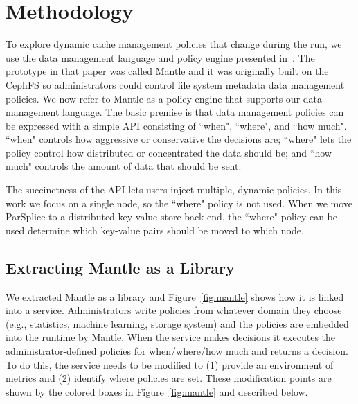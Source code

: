 \section{Methodology}

To explore dynamic cache management policies that change during the run, we use
the data management language and policy engine presented
in~\cite{sevilla:sc15-mantle}. The prototype in that paper was called Mantle
and it was originally built on the CephFS so administrators could control file
system metadata data management policies. We now refer to Mantle as a policy
engine that supports our data management language.  The basic premise is that
data management policies can be expressed with a simple API consisting of
``when", ``where", and ``how much". ``when" controls how aggressive or
conservative the decisions are; ``where" lets the policy control how
distributed or concentrated the data should be; and ``how much" controls the
amount of data that should be sent.

The succinctness of the API lets users inject multiple, dynamic policies. In
this work we focus on a single node, so the ``where" policy is not used. When
we move ParSplice to a distributed key-value store back-end, the ``where" policy
can be used determine which key-value pairs should be moved to which node.

\subsection{Extracting Mantle as a Library}
\label{sec:extracting}


We extracted Mantle as a library and Figure~\ref{fig:mantle} shows how it is
linked into a service.  Administrators write policies from whatever domain they
choose ({e.g.}, statistics, machine learning, storage system) and the policies
are embedded into the runtime by Mantle. When the service makes decisions it
executes the administrator-defined policies for when/where/how much and returns
a decision.  To do this, the service needs to be modified to (1) provide an
environment of metrics and (2) identify where policies are set. These
modification points are shown by the colored boxes in Figure~\ref{fig:mantle}
and described below.

